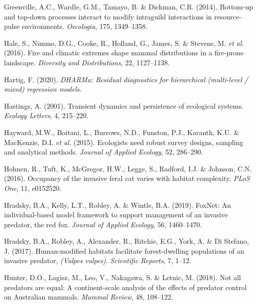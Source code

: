 \documentclass[11pt,a4paper,titlepage,twoside,openright]{style/unimelbthesis}
\begin{document}
\begin{mainmatter}
\leavevmode\hypertarget{ref-greenville2014bottom}{}%
Greenville, A.C., Wardle, G.M., Tamayo, B. \& Dickman, C.R. (2014). Bottom-up and top-down processes interact to modify intraguild interactions in resource-pulse environments. \emph{Oecologia}, 175, 1349--1358.

\leavevmode\hypertarget{ref-https:ux2fux2fdoi.orgux2f10.1111ux2fddi.12471}{}%
Hale, S., Nimmo, D.G., Cooke, R., Holland, G., James, S. \& Stevens, M. \emph{et al.} (2016). Fire and climatic extremes shape mammal distributions in a fire-prone landscape. \emph{Diversity and Distributions}, 22, 1127--1138.

\leavevmode\hypertarget{ref-DHARMa}{}%
Hartig, F. (2020). \emph{DHARMa: Residual diagnostics for hierarchical (multi-level / mixed) regression models}.

\leavevmode\hypertarget{ref-hastings2001transient}{}%
Hastings, A. (2001). Transient dynamics and persistence of ecological systems. \emph{Ecology Letters}, 4, 215--220.

\leavevmode\hypertarget{ref-hayward2015ecologists}{}%
Hayward, M.W., Boitani, L., Burrows, N.D., Funston, P.J., Karanth, K.U. \& MacKenzie, D.I. \emph{et al.} (2015). Ecologists need robust survey designs, sampling and analytical methods. \emph{Journal of Applied Ecology}, 52, 286--290.

\leavevmode\hypertarget{ref-hohnen2016occupancy}{}%
Hohnen, R., Tuft, K., McGregor, H.W., Legge, S., Radford, I.J. \& Johnson, C.N. (2016). Occupancy of the invasive feral cat varies with habitat complexity. \emph{PLoS One}, 11, e0152520.

\leavevmode\hypertarget{ref-hradsky2019foxnet}{}%
Hradsky, B.A., Kelly, L.T., Robley, A. \& Wintle, B.A. (2019). FoxNet: An individual-based model framework to support management of an invasive predator, the red fox. \emph{Journal of Applied Ecology}, 56, 1460--1470.

\leavevmode\hypertarget{ref-hradsky2017human}{}%
Hradsky, B.A., Robley, A., Alexander, R., Ritchie, E.G., York, A. \& Di Stefano, J. (2017). Human-modified habitats facilitate forest-dwelling populations of an invasive predator, \emph{(Vulpes vulpes)}. \emph{Scientific Reports}, 7, 1--12.

\leavevmode\hypertarget{ref-hunter2018not}{}%
Hunter, D.O., Lagisz, M., Leo, V., Nakagawa, S. \& Letnic, M. (2018). Not all predators are equal: A continent-scale analysis of the effects of predator control on Australian mammals. \emph{Mammal Review}, 48, 108--122.


\end{mainmatter}
\end{document}
